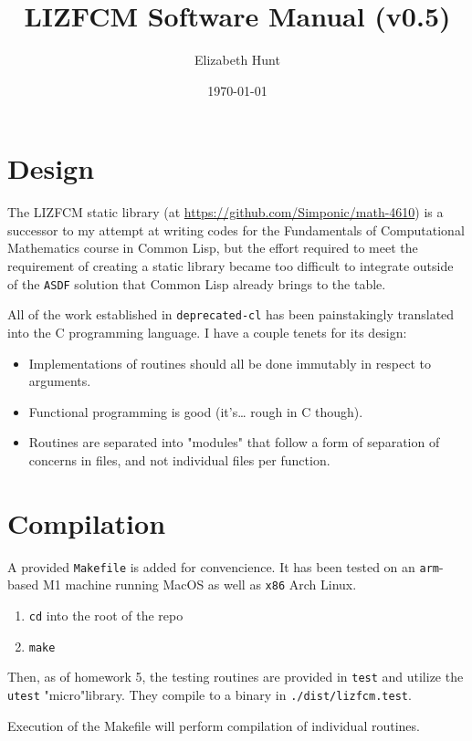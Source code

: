 \documentclass[11pt]{article}
\author{Elizabeth Hunt}
\date{\today}
\title{LIZFCM Software Manual (v0.5)}
\begin{document}
\maketitle
\tableofcontents

\setlength\parindent{0pt}
\section{Design}
\label{sec:orge377960}
The LIZFCM static library (at \url{https://github.com/Simponic/math-4610}) is a successor to my
attempt at writing codes for the Fundamentals of Computational Mathematics course in Common
Lisp, but the effort required to meet the requirement of creating a static library became
too difficult to integrate outside of the \texttt{ASDF} solution that Common Lisp already brings
to the table.

All of the work established in \texttt{deprecated-cl} has been painstakingly translated into
the C programming language. I have a couple tenets for its design:

\begin{itemize}
\item Implementations of routines should all be done immutably in respect to arguments.
\item Functional programming is good (it's\ldots{} rough in C though).
\item Routines are separated into "modules" that follow a form of separation of concerns
in files, and not individual files per function.
\end{itemize}
\section{Compilation}
\label{sec:orge5bfe63}
A provided \texttt{Makefile} is added for convencience. It has been tested on an \texttt{arm}-based M1 machine running
MacOS as well as \texttt{x86} Arch Linux.

\begin{enumerate}
\item \texttt{cd} into the root of the repo
\item \texttt{make}
\end{enumerate}

Then, as of homework 5, the testing routines are provided in \texttt{test} and utilize the
\texttt{utest} "micro"library. They compile to a binary in \texttt{./dist/lizfcm.test}.

Execution of the Makefile will perform compilation of individual routines.
\end{document}
